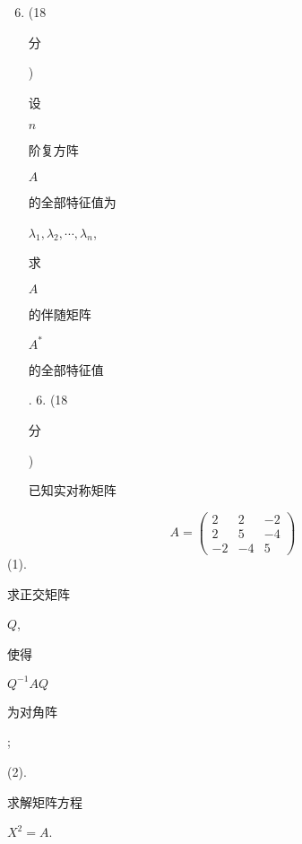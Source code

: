 \documentclass[10pt]{article}
\begin{document}
\begin{enumerate}
  \setcounter{enumi}{5}
  \item (18 \begin{CJK}{UTF8}{mj}分\end{CJK}) \begin{CJK}{UTF8}{mj}设\end{CJK} $n$ \begin{CJK}{UTF8}{mj}阶复方阵\end{CJK} $A$ \begin{CJK}{UTF8}{mj}的全部特征值为\end{CJK} $\lambda_{1}, \lambda_{2}, \cdots, \lambda_{n}$, \begin{CJK}{UTF8}{mj}求\end{CJK} $A$ \begin{CJK}{UTF8}{mj}的伴随矩阵\end{CJK} $A^{*}$ \begin{CJK}{UTF8}{mj}的全部特征值\end{CJK}. 6. (18 \begin{CJK}{UTF8}{mj}分\end{CJK}) \begin{CJK}{UTF8}{mj}已知实对称矩阵\end{CJK}
\end{enumerate}
$$
A=\left(\begin{array}{ccc}
2 & 2 & -2 \\
2 & 5 & -4 \\
-2 & -4 & 5
\end{array}\right)
$$
(1). \begin{CJK}{UTF8}{mj}求正交矩阵\end{CJK} $Q$, \begin{CJK}{UTF8}{mj}使得\end{CJK} $Q^{-1} A Q$ \begin{CJK}{UTF8}{mj}为对角阵\end{CJK};

(2). \begin{CJK}{UTF8}{mj}求解矩阵方程\end{CJK} $X^{2}=A$.
\end{document}
